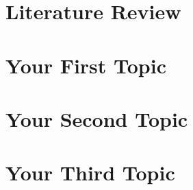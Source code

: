 \documentclass[12pt]{report}
\newcommand{\nc}{\newpage \clearpage}
\begin{document}
\begingroup
\setlength\parskip{\baselineskip}
\endgroup

\begin{doublespace}
\cleardoublepage %


\chapter{Literature Review} \label{Chp:LitReview}



\chapter{Your First Topic} \label{Chp:topic1}



\chapter{Your Second Topic} \label{Chp:topic2}



\chapter[Topic 3 short title]{Your Third Topic} \label{Chp:topic3}




\appendix
\newcommand{\appchapter}[1]{\let\oldthechapter\thechapter
  \renewcommand{\thechapter}{Appendix A}  
  \section{#1}\let\thechapter\oldthechapter}

\newpage
{}
\renewcommand{\thesection}{A.\arabic{section}}
	
\nc

%
%
%


\end{doublespace}
\end{document}
